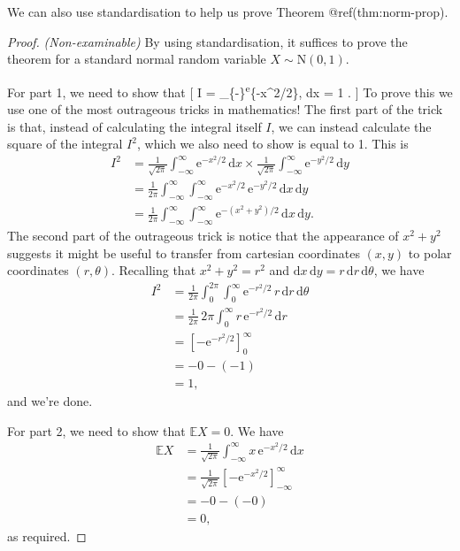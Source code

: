\documentclass[
  letterpaper,
  DIV=11,
  numbers=noendperiod]{scrreprt}
\theoremstyle{remark}
\begin{document}
We can also use standardisation to help us prove Theorem
@ref(thm:norm-prop).

\begin{proof}

\emph{(Non-examinable)} By using standardisation, it suffices to prove
the theorem for a standard normal random variable
\(X \sim \mathrm{N}(0,1)\).

For part 1, we need to show that {[} I = 
\int\_\{-\infty\}\textsuperscript{\infty \mathrm e}\{-x\^{}2/2\},
\mathrm dx = 1 . {]} To prove this we use one of the most outrageous
tricks in mathematics! The first part of the trick is that, instead of
calculating the integral itself \(I\), we can instead calculate the
square of the integral \(I^2\), which we also need to show is equal to
1. This is \begin{align*}
  I^2 &= \frac{1}{\sqrt{2\pi}} \int_{-\infty}^\infty \mathrm e^{-x^2/2}\, \mathrm dx \times \frac{1}{\sqrt{2\pi}} \int_{-\infty}^\infty \mathrm e^{-y^2/2}\, \mathrm dy\\
    &= \frac{1}{2\pi} \int_{-\infty}^\infty \int_{-\infty}^\infty  \mathrm e^{-x^2/2}\,\mathrm e^{-y^2/2} \, \mathrm dx\, \mathrm dy \\
    &= \frac{1}{2\pi} \int_{-\infty}^\infty \int_{-\infty}^\infty  \mathrm e^{-(x^2+y^2)/2}\,\mathrm dx\, \mathrm dy .
\end{align*} The second part of the outrageous trick is notice that the
appearance of \(x^2 + y^2\) suggests it might be useful to transfer from
cartesian coordinates \((x,y)\) to polar coordinates \((r, \theta)\).
Recalling that \(x^2 + y^2 = r^2\) and
\(\mathrm dx\, \mathrm dy = r\, \mathrm dr \,\mathrm d\theta\), we have
\begin{align*}
  I^2 &= \frac{1}{2\pi} \int_{0}^{2\pi} \int_{0}^\infty  \mathrm e^{-r^2/2}\,r\,\mathrm dr\, \mathrm d\theta \\
    &= \frac{1}{2\pi} \, 2\pi\int_{0}^\infty  r\, \mathrm e^{-r^2/2}\,\mathrm dr \\
    &= \left[ -\mathrm e^{-r^2/2} \right]_0^\infty \\
    &= - 0 -(-1) \\
    &= 1 ,
\end{align*} and we're done.

For part 2, we need to show that \(\mathbb EX = 0\). We have
\begin{align*}
\mathbb EX &= \frac{1}{\sqrt{2\pi}} \int_{-\infty}^{\infty} x\,  \mathrm e^{-x^2/2}\, \mathrm dx \\
  &= \frac{1}{\sqrt{2\pi}} \left[-\mathrm e^{-x^2/2}\right]_{-\infty}^\infty \\
  &= -0 - (-0) \\
  &= 0 ,
\end{align*} as required.


\end{proof}
\end{document}
